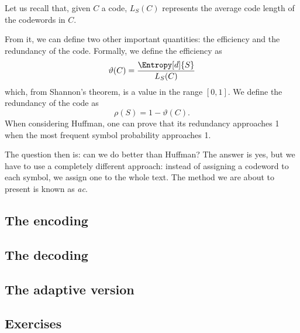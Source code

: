 \documentclass{subfiles}
\begin{document}
    Let us recall that, given \(C\) a code, 
        \(L_{S}(C)\) represents the average code length of the codewords in \(C\).

    From it, we can define two other important quantities: 
        the efficiency and the redundancy of the code.
        Formally, we define the efficiency as 
        \[
            \vartheta(C) = \frac{\Entropy[d]{S}}{L_{S}(C)}
        \]
        which, from Shannon's theorem, is a value in the range \([0, 1]\).
        We define the redundancy of the code as 
        \[
            \rho(S) = 1 - \vartheta(C)\text{.}
        \]
        When considering Huffman, 
            one can prove that its redundancy approaches 1 when the most 
            frequent symbol probability approaches 1.

        The question then is: can we do better than Huffman?
            The answer is yes, but we have to use a completely different approach:
            instead of assigning a codeword to each symbol, 
            we assign one to the whole text.
            The method we are about to present is known as \emph{\gls{ac}}.

        \subsection{The encoding}
        

        \subsection{The decoding}
        

        \subsection{The adaptive version}
        

        \subsection{Exercises}
        
\end{document}
